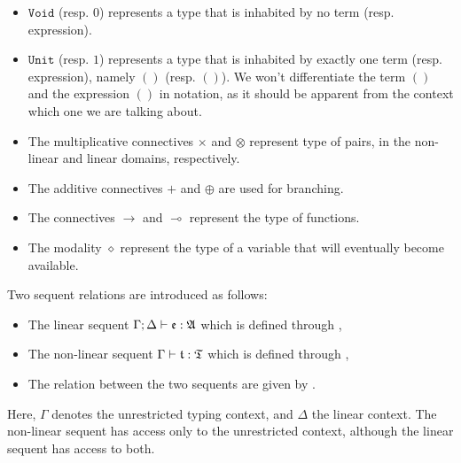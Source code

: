 \begin{itemize}
    \item $\mathtt{Void}$ (resp. $0$) represents a type that is inhabited by no term (resp. expression).
    \item $\mathtt{Unit}$ (resp. $1$) represents a type that is inhabited by exactly one term (resp. expression), namely $()$ (resp. $()$). We won't differentiate the term $()$ and the expression $()$ in notation, as it should be apparent from the context which one we are talking about.
    \item The multiplicative connectives $\times$ and $\otimes$ represent type of pairs, in the non-linear and linear domains, respectively.
    \item The additive connectives $+$ and $\oplus$ are used for branching.
    \item The connectives $\rightarrow$ and $\multimap$ represent the type of functions.
    \item The modality $\diamond$ represent the type of a variable that will eventually become available.
\end{itemize}

\begin{definition}
Two sequent relations are introduced as follows:
\begin{itemize}
    \item The linear sequent $\Gamma; \Delta \vdash \mathfrak{e} : \mathfrak{A}$ which is defined through ,
    \item The non-linear sequent $\Gamma \vdash \mathfrak{t} : \mathfrak{T}$ which is defined through ,
    \item The relation between the two sequents are given by .
\end{itemize}
Here, $\Gamma$ denotes the unrestricted typing context, and $\Delta$ the linear context. The non-linear sequent has access only to the unrestricted context, although the linear sequent has access to both.
\end{definition}